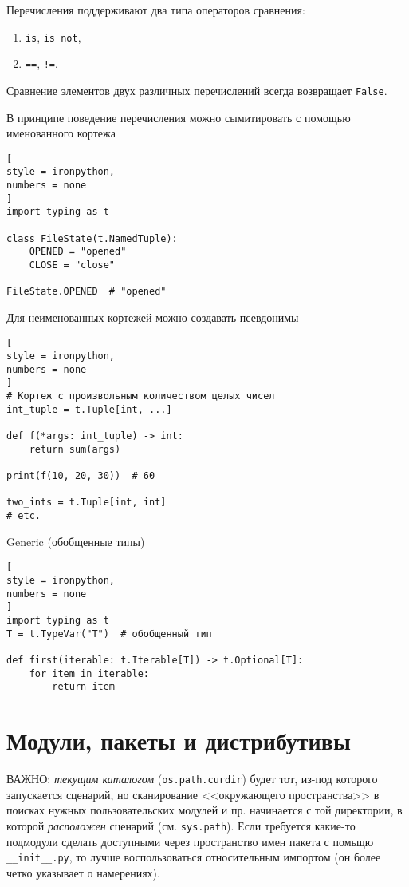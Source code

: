 \documentclass[%
	11pt,
	a4paper,
	utf8,
		]{article}
\begin{document}
Перечисления поддерживают два типа операторов сравнения:
\begin{enumerate}
	\item \verb*|is|, \verb*|is not|,
	
	\item \verb*|==|, \verb*|!=|.
\end{enumerate}

Сравнение элементов двух различных перечислений всегда возвращает \verb*|False|.

В принципе поведение перечисления можно сымитировать с помощью именованного кортежа
\begin{lstlisting}[
style = ironpython,
numbers = none	
]
import typing as t

class FileState(t.NamedTuple):
    OPENED = "opened"
    CLOSE = "close"
    
FileState.OPENED  # "opened"
\end{lstlisting}

Для неименованных кортежей можно создавать псевдонимы
\begin{lstlisting}[
style = ironpython,
numbers = none
]
# Кортеж с произвольным количеством целых чисел
int_tuple = t.Tuple[int, ...]

def f(*args: int_tuple) -> int:
    return sum(args)
    
print(f(10, 20, 30))  # 60

two_ints = t.Tuple[int, int]
# etc.
\end{lstlisting}

Generic (обобщенные типы)
\begin{lstlisting}[
style = ironpython,
numbers = none
]
import typing as t
T = t.TypeVar("T")  # обобщенный тип

def first(iterable: t.Iterable[T]) -> t.Optional[T]:
    for item in iterable:
        return item
\end{lstlisting}


\section{Модули, пакеты и дистрибутивы}

ВАЖНО: \emph{текущим каталогом} (\verb|os.path.curdir|) будет тот, из-под которого запускается сценарий, но сканирование <<окружающего пространства>> в поисках нужных пользовательских модулей и пр. начинается с той директории, в которой \emph{расположен} сценарий (см. \verb|sys.path|). Если требуется какие-то подмодули сделать доступными через пространство имен пакета с помьщю \verb|__init__.py|, то лучше воспользоваться относительным импортом (он более четко указывает о намерениях).
\end{document}

